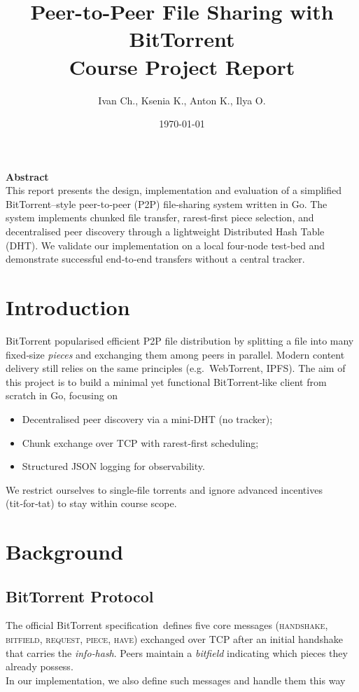 \documentclass[11pt,a4paper]{article}
\title{Peer-to-Peer File Sharing with BitTorrent\\
\large Course Project Report}
\author{Ivan Ch., Ksenia K., Anton K., Ilya O.}
\date{\today}
\begin{document}
\maketitle
\thispagestyle{empty}
\vspace*{\fill}
\begin{center}
\textbf{Abstract}\\[0.5em]
This report presents the design, implementation and evaluation of a simplified BitTorrent--style peer-to‑peer (P2P) file‑sharing system written in Go.  
The system implements chunked file transfer, rarest‑first piece selection, and decentralised peer discovery through a lightweight Distributed Hash Table (DHT).  
We validate our implementation on a local four‑node test‑bed and demonstrate successful end‑to‑end transfers without a central tracker.
\end{center}
\vspace*{\fill}
\clearpage

\tableofcontents
\clearpage

\section{Introduction}
BitTorrent popularised efficient P2P file distribution by splitting a file into many fixed‑size \emph{pieces} and exchanging them among peers in parallel.
Modern content delivery still relies on the same principles (e.g.\ WebTorrent, IPFS).
The aim of this project is to build a minimal yet functional BitTorrent‑like client from scratch in Go, focusing on
\begin{itemize}
  \item Decentralised peer discovery via a mini‑DHT (no tracker);
  \item Chunk exchange over TCP with rarest‑first scheduling;
  \item Structured JSON logging for observability.
\end{itemize}
We restrict ourselves to single‑file torrents and ignore advanced incentives (tit‑for‑tat) to stay within course scope.

\section{Background}\label{sec:background}
\subsection{BitTorrent Protocol}
The official BitTorrent specification\,\cite{bittorrent_spec} defines five core messages (\textsc{handshake}, \textsc{bitfield}, \textsc{request}, \textsc{piece}, \textsc{have}) exchanged over TCP after an initial handshake that carries the \emph{info‑hash}.
Peers maintain a \emph{bitfield} indicating which pieces they already possess.
\\ In our implementation, we also define such messages and handle them this way 
\end{document}
